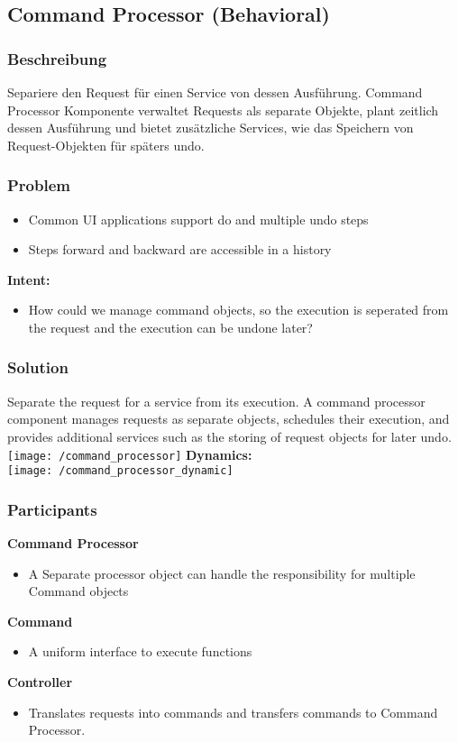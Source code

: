\subsection{Command Processor (Behavioral)}
\subsubsection{Beschreibung}
Separiere den Request für einen Service von dessen Ausführung. Command Processor Komponente verwaltet Requests als separate Objekte, plant zeitlich dessen Ausführung und bietet zusätzliche Services, wie das Speichern von Request-Objekten für späters undo.
\subsubsection{Problem}
\begin{itemize}[topsep=0pt]
    \itemsep -0.4em
    \item Common UI applications support do and multiple undo steps
    \item Steps forward and backward are accessible in a history
\end{itemize}
\textbf{Intent:}
\begin{itemize}
    \item How could we manage command objects, so the execution is seperated from the request and the execution can be undone later?
\end{itemize}
\subsubsection{Solution}
Separate the request for a service from its execution. A command processor component manages requests as separate objects, schedules their execution, and provides additional services such as the storing of request objects for later undo.\\ 
\texttt{[image: /command\_processor]}
\textbf{Dynamics:}\\ 
\texttt{[image: /command\_processor\_dynamic]}
\subsubsection{Participants}
\textbf{Command Processor}
\begin{itemize}[topsep=0pt]
    \itemsep -0.4em
    \item A Separate processor object can handle the responsibility for multiple Command objects
\end{itemize}
\textbf{Command}
\begin{itemize}[topsep=0pt]
    \itemsep -0.4em
    \item A uniform interface to execute functions
\end{itemize}
\textbf{Controller}
\begin{itemize}[topsep=0pt]
    \itemsep -0.4em
    \item Translates requests into commands and transfers commands to Command Processor.
\end{itemize}
